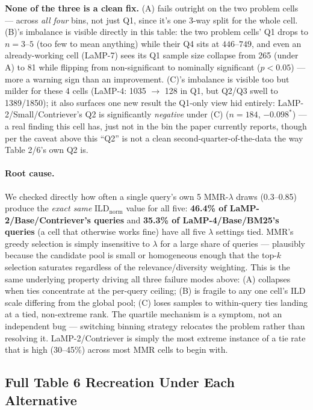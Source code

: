 \documentclass[10pt]{article}
\begin{document}
\textbf{None of the three is a clean fix.} (A) fails outright on the two problem
cells --- across \emph{all four} bins, not just Q1, since it's one 3-way split for
the whole cell. (B)'s imbalance is visible directly in this table: the two problem
cells' Q1 drops to $n{=}3$--$5$ (too few to mean anything) while their Q4 sits at
$446$--$749$, and even an already-working cell (LaMP-7) sees its Q1 sample size
collapse from 265 (under A) to 81 while flipping from non-significant to nominally
significant ($p{<}0.05$) --- more a warning sign than an improvement. (C)'s
imbalance is visible too but milder for these 4 cells (LaMP-4: 1035 $\to$ 128 in
Q1, but Q2/Q3 swell to 1389/1850); it also surfaces one new result the Q1-only view
hid entirely: LaMP-2/Small/Contriever's Q2 is significantly \emph{negative} under
(C) ($n{=}184$, $-0.098^{*}$) --- a real finding this cell has, just not in the bin
the paper currently reports, though per the caveat above this ``Q2'' is not a clean
second-quarter-of-the-data the way Table 2/6's own Q2 is.

\paragraph{Root cause.} We checked directly how often a single query's own 5
MMR-$\lambda$ draws (0.3--0.85) produce the \emph{exact same} ILD$_{\text{norm}}$
value for all five: \textbf{46.4\% of LaMP-2/Base/Contriever's queries} and
\textbf{35.3\% of LaMP-4/Base/BM25's queries} (a cell that otherwise works fine)
have all five $\lambda$ settings tied. MMR's greedy selection is simply insensitive
to $\lambda$ for a large share of queries --- plausibly because the candidate pool
is small or homogeneous enough that the top-$k$ selection saturates regardless of
the relevance/diversity weighting. This is the same underlying property driving all
three failure modes above: (A) collapses when ties concentrate at the per-query
ceiling; (B) is fragile to any one cell's ILD scale differing from the global pool;
(C) loses samples to within-query ties landing at a tied, non-extreme rank. The
quartile mechanism is a symptom, not an independent bug --- switching binning
strategy relocates the problem rather than resolving it. LaMP-2/Contriever is simply
the most extreme instance of a tie rate that is high (30--45\%) across most
MMR cells to begin with.

\FloatBarrier
\subsection{Full Table 6 Recreation Under Each Alternative}
\label{sec:full-tables}
\end{document}
